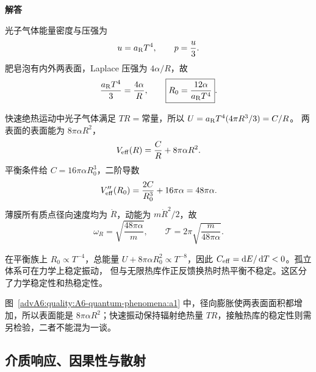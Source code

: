 \begin{advsolution}
\begin{center}\begin{minipage}{.96\linewidth}\centering
\raggedright{\bfseries\color{DeepBlue}解答}\par\smallskip\centering

\label{advA6:quality:A6-quantum-phenomena:a1}
\end{minipage}\end{center}

光子气体能量密度与压强为
\[
 u=a_{\rm R}T^4,\qquad p=\frac u3.
\]
肥皂泡有内外两表面，Laplace 压强为 $4\alpha/R$，故
\[
 \frac{a_{\rm R}T^4}{3}=\frac{4\alpha}{R},
\qquad
 \boxed{R_0=\frac{12\alpha}{a_{\rm R}T^4}}.
\]

快速绝热运动中光子气体满足 $TR=\text{常量}$，所以
$U=a_{\rm R}T^4(4\pi R^3/3)=C/R$。
两表面的表面能为 $8\pi\alpha R^2$，
\[
 V_{\rm eff}(R)=\frac CR+8\pi\alpha R^2.
\]
平衡条件给 $C=16\pi\alpha R_0^3$，二阶导数
\[
 V_{\rm eff}''(R_0)=\frac{2C}{R_0^3}+16\pi\alpha
 =48\pi\alpha.
\]
薄膜所有质点径向速度均为 $\dot R$，动能为 $m\dot R^2/2$，故
\[
 \boxed{\omega_R=\sqrt{\frac{48\pi\alpha}{m}}},
\qquad
 \boxed{\mathcal T=2\pi\sqrt{\frac{m}{48\pi\alpha}}}.
\]

在平衡族上 $R_0\propto T^{-4}$，总能量
$U+8\pi\alpha R_0^2\propto T^{-8}$，因此
$C_{\rm eff}=\mathop{}\!\mathrm d E/\mathop{}\!\mathrm d T<0$。孤立体系可在力学上稳定振动，
但与无限热库作正反馈换热时热平衡不稳定。这区分了力学稳定性和热稳定性。

图~\ref{advA6:quality:A6-quantum-phenomena:a1} 中，径向膨胀使两表面面积都增加，所以表面能是 $8\pi\alpha R^2$；快速振动保持辐射绝热量 $TR$，接触热库的稳定性则需另检验，二者不能混为一谈。
\end{advsolution}

\subsection{介质响应、因果性与散射}


